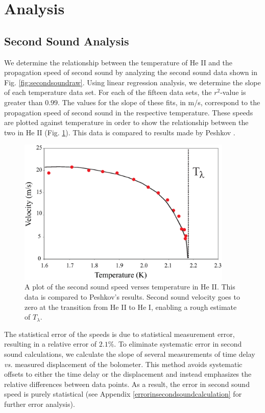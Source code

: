 
\section{Analysis}\label{analysis}
\subsection{Second Sound Analysis}\label{secondsoundanalysis}

We determine the relationship between the temperature of He II and the propagation speed of second sound by analyzing the second sound data shown in Fig. \ref{fig:secondsoundraw}. Using linear regression analysis, we determine the slope of each temperature data set.  For each of the fifteen data sets, the $r^{2}$-value is greater than $0.99$.  The values for the slope of these fits, in m/s, correspond to the propagation speed of second sound in the respective temperature.  These speeds are plotted against temperature in order to show the relationship between the two in He II (Fig. \ref{fig:secondsound}).  This data is compared to results made by Peshkov \cite{peshkov}.
\begin{figure}[htbp]
\begin{center}
\includegraphics[height=70mm]{./figures/secondsound.eps}
\caption{\small{A plot of the second sound speed verses temperature in He II.  This data is compared to Peshkov's results\cite{peshkov}. Second sound velocity goes to zero at the transition from He II to He I, enabling a rough estimate of $T_{\lambda}$.}}
\label{fig:secondsound}
\end{center}
\end{figure}

The statistical error of the speeds is due to statistical measurement error, resulting in a relative error of $2.1\%$. To eliminate systematic error in second sound calculations, we calculate the slope of several measurements of time delay \emph{vs.} measured displacement of the bolometer. This method avoids systematic offsets to either the time delay or the displacement and instead emphasizes the relative differences between data points. As a result, the error in second sound speed is purely statistical (see Appendix \ref{errorinsecondsoundcalculation} for further error analysis).

